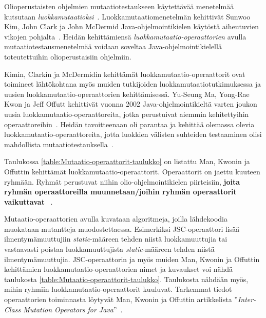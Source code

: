\documentclass[finnish, grading]{tktltiki2}
\theoremstyle{definition}
\theoremstyle{remark}
\begin{document}
Olioperustaisten ohjelmien mutaatiotestaukseen käytettävää menetelmää kutsutaan \textit{luokkamutaatioksi}~\cite{Kim:Clark:McDermid:2000}. Luokkamutaatiomenetelmän kehittivät Sunwoo Kim, John Clark ja John McDermid Java-oh\-jel\-moin\-ti\-kie\-len käytöstä aiheutuvien vikojen pohjalta~\cite{Kim:Clark:McDermid:2000}. Heidän kehittämiensä \textit{luokkamutaatio-operaattorien} avulla mutaatiotestausmenetelmää voidaan soveltaa Java-ohjelmointikielellä toteutettuihin olioperustaisiin ohjelmiin.

Kimin, Clarkin ja McDermidin kehittämät luokkamutaatio-operaattorit ovat toimineet lähtökohtana myös muiden tutkijoiden luokkamutaatiotutkimuksessa ja uusien luokkamutaatio-operaattorien kehittämisessä. Yu-Seung Ma, Yong-Rae Kwon ja Jeff Offutt kehittivät vuonna 2002 Java-oh\-jel\-moin\-ti\-kiel\-tä varten joukon uusia luokkamutaatio-operaattoreita, jotka perustuivat aiemmin kehitettyihin operaattoreihin~\cite[s. 352-353]{Ma:Kwon:Offutt:2002}. Heidän tavoitteenaan oli parantaa ja kehittää olemassa olevia luokkamutaatio-operaattoreita, jotta luokkien välisten suhteiden testaaminen olisi mahdollista mutaatiotestauksella~\cite[s. 362]{Ma:Kwon:Offutt:2002}.

Taulukossa \ref{table:Mutaatio-operaattorit-taulukko} on listattu Man, Kwonin ja Offuttin kehittämät luok\-ka\-mu\-taa\-ti\-o-o\-pe\-raat\-to\-rit. Operaattorit on jaettu kuuteen ryhmään. Ryhmät perustuvat niihin olio-ohjelmointikielen piirteisiin, \textbf{joita ryhmän operaattoreilla muunnetaan/joihin ryhmän operaattorit vaikuttavat }~\cite[s. 355]{Ma:Kwon:Offutt:2002}.

Mutaatio-operaattorien avulla kuvataan algoritmeja, joilla lähdekoodia muokataan mutantteja muodostettaessa. Esimerkiksi JSC-operaattori lisää ilmentymämuuttujiin \textit{static}-määreen tehden niistä luokkamuuttujia tai vastaavasti poistaa luokkamuuttujista \textit{static}-määreen tehden niistä ilmentymämuuttujia. JSC-operaattorin ja myös muiden Man, Kwonin ja Offuttin kehittämien luokkamutaatio-operaattorien nimet ja kuvaukset voi nähdä taulukosta \ref{table:Mutaatio-operaattorit-taulukko}. Taulukosta nähdään myös, mihin ryhmiin luokkamutaatio-operaattorit kuuluvat. Tarkemmat tiedot operaattorien toiminnasta löytyvät Man, Kwonin ja Offuttin artikkelista ''\textit{Inter-Class Mutation Operators for Java}''~\cite{Ma:Kwon:Offutt:2002}. 
\end{document}
